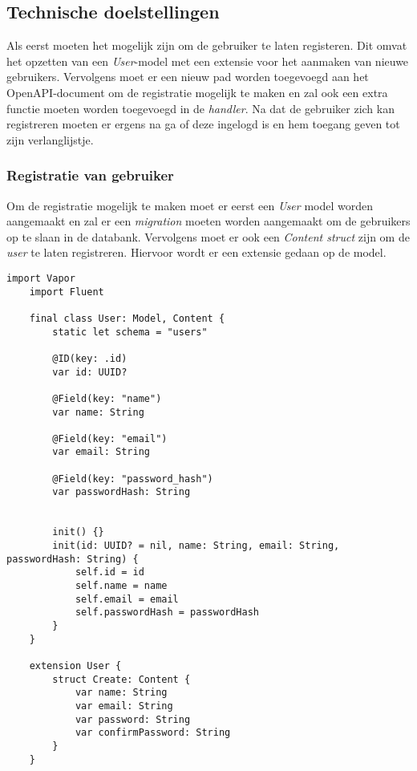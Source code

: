 \subsection{Technische doelstellingen}
Als eerst moeten het mogelijk zijn om de gebruiker te laten registeren. Dit omvat het opzetten van een \textit{User}-model met een extensie voor het aanmaken van nieuwe gebruikers. Vervolgens moet er een nieuw pad worden toegevoegd aan het OpenAPI-document om de registratie mogelijk te maken en zal ook een extra functie moeten worden toegevoegd in de \textit{handler}. 
Na dat de gebruiker zich kan registreren moeten er ergens na ga of deze ingelogd is en hem toegang geven tot zijn verlanglijstje. 
 
 \subsubsection{Registratie van gebruiker}
Om de registratie mogelijk te maken moet er eerst een \textit{User} model worden aangemaakt en zal er een \textit{migration} moeten worden aangemaakt om de gebruikers op te slaan in de databank. Vervolgens moet er ook een \textit{Content struct} zijn om de \textit{user} te laten registreren. Hiervoor wordt er een extensie gedaan op de model. 

\begin{lstlisting}[caption=Model file]
    import Vapor
    import Fluent
    
    final class User: Model, Content {
        static let schema = "users"
        
        @ID(key: .id)
        var id: UUID?
        
        @Field(key: "name")
        var name: String
        
        @Field(key: "email")
        var email: String
        
        @Field(key: "password_hash")
        var passwordHash: String
        
        
        init() {}
        init(id: UUID? = nil, name: String, email: String, passwordHash: String) {
            self.id = id
            self.name = name
            self.email = email
            self.passwordHash = passwordHash
        } 
    }
    
    extension User {
        struct Create: Content {
            var name: String
            var email: String
            var password: String
            var confirmPassword: String
        }
    }
    
    
\end{lstlisting}

